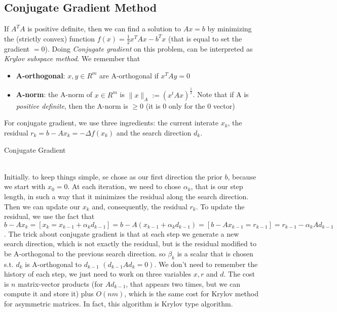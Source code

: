\documentclass{article}
\begin{document}
\subsection{Conjugate Gradient Method}
If $A^{T}A$ is positive definite, then we can find a solution to $Ax = b$ by minimizing the (strictly convex) function $f(x) = \frac{1}{2}x^{T}Ax - b^{T}x$ (that is equal to set the gradient $= 0$). Doing \textit{Conjugate gradient} on this problem, can be interpreted as \textit{Krylov subspace method}. We remember that \begin{itemize}
\item \textbf{A-orthogonal}: $x, y \in R^{m}$ are A-orthogonal if $x^{T}Ay = 0$
\item \textbf{A-norm}: the A-norm of $x \in R^{m}$ is $\|x\|_{A} := (x^{t}Ax)^{\frac{1}{2}}$. Note that if A is \textit{positive definite}, then the A-norm is $\geq 0$ (it is $0$ only for the $0$ vector)
\end{itemize}
For conjugate gradient, we use three ingredients: the current interate $x_{k}$, the residual $r_{k} = b - Ax_{k} = -\Delta f(x_{k})$ and the search direction $d_{k}$.
\makeatletter
\def\BState{\State\hskip-\ALG@thistlm}
\makeatother
\begin{algorithm}
\caption{Conjugate Gradient}\label{euclid}
\end{algorithm}
\\Initially. to keep things simple, se chose as our first direction the prior $b$, because we start with $x_{0} = 0$. At each iteration, we need to chose $\alpha_{k}$, that is our step length, in such a way that it minimizes the residual along the search direction. Then we can update our $x_{k}$ and, consequently, the residual $r_{k}$. To update the residual, we use the fact that $b - Ax_{k} = [x_{k} = x_{k-1} + \alpha_{k}d_{k-1}] = b - A(x_{k-1} + \alpha_{k}d_{k-1}) = [b-Ax_{k-1} = r_{k-1}] = r_{k-1} - \alpha_{k}Ad_{k-1}$. The trick about conjugate gradient is that at each step we generate a new search direction, which is not exactly the residual, but is the residual modified to be A-orthogonal to the previous search direction. so $\beta_{k}$ is a scalar that is chosen s.t. $d_{k}$ is A-orthogonal to $d_{k-1}$ $(d_{k-1}Ad_{k} = 0)$. We don't need to remember the history of each step, we just need to work on three variables $x, r$ and $d$. The cost is $n$ matrix-vector products (for $Ad_{k-1}$, that appears two times, but we can compute it and store it) plus $O(nm)$, which is the same cost for Krylov method for asymmetric matrices. In fact, this algorithm is Krylov type algorithm.
\end{document}
